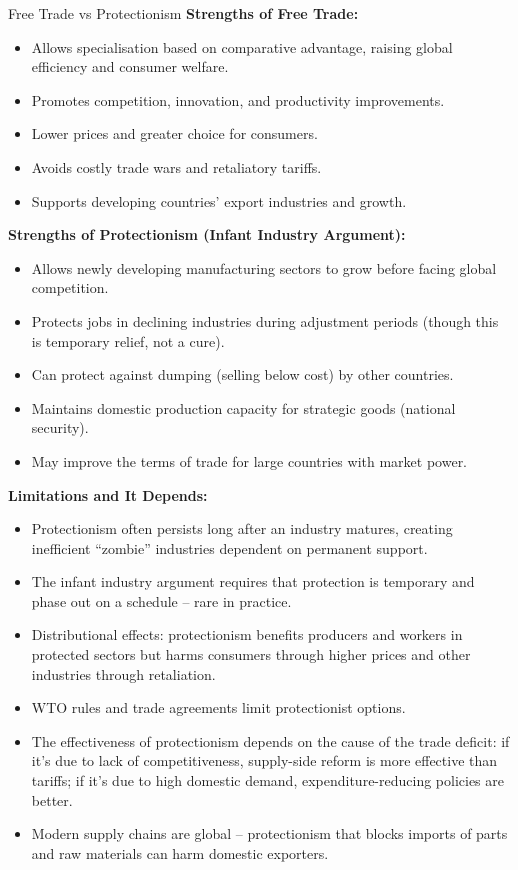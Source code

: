 \documentclass[11pt, a4paper, twoside]{book}
\begin{document}
\begin{evaluation}{Free Trade vs Protectionism}
\textbf{Strengths of Free Trade:}
\begin{itemize}
  \item Allows specialisation based on comparative advantage, raising global efficiency and consumer welfare.
  \item Promotes competition, innovation, and productivity improvements.
  \item Lower prices and greater choice for consumers.
  \item Avoids costly trade wars and retaliatory tariffs.
  \item Supports developing countries' export industries and growth.
\end{itemize}

\textbf{Strengths of Protectionism (Infant Industry Argument):}
\begin{itemize}
  \item Allows newly developing manufacturing sectors to grow before facing global competition.
  \item Protects jobs in declining industries during adjustment periods (though this is temporary relief, not a cure).
  \item Can protect against dumping (selling below cost) by other countries.
  \item Maintains domestic production capacity for strategic goods (national security).
  \item May improve the terms of trade for large countries with market power.
\end{itemize}

\textbf{Limitations and It Depends:}
\begin{itemize}
  \item Protectionism often persists long after an industry matures, creating inefficient ``zombie'' industries dependent on permanent support.
  \item The infant industry argument requires that protection is temporary and phase out on a schedule -- rare in practice.
  \item Distributional effects: protectionism benefits producers and workers in protected sectors but harms consumers through higher prices and other industries through retaliation.
  \item WTO rules and trade agreements limit protectionist options.
  \item The effectiveness of protectionism depends on the cause of the trade deficit: if it's due to lack of competitiveness, supply-side reform is more effective than tariffs; if it's due to high domestic demand, expenditure-reducing policies are better.
  \item Modern supply chains are global -- protectionism that blocks imports of parts and raw materials can harm domestic exporters.
\end{itemize}
\end{evaluation}
\end{document}
